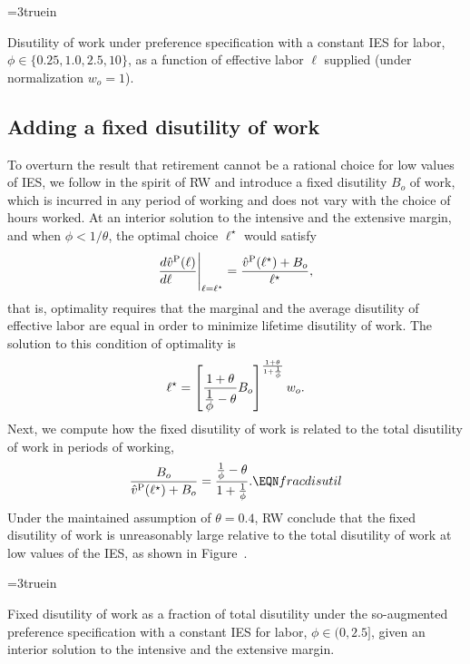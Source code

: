 
\centerline{\epsfxsize=3truein}
\caption{Disutility of work under preference specification 
with a constant IES for labor, 
$\phi\in\{0.25, 1.0, 2.5, 10\}$, 
as a function of effective labor $\ell$ supplied
(under normalization $w_o =1$).}
\endfigure

\subsection{Adding a fixed disutility of work}

To overturn the result that retirement cannot be a rational choice
for low values of IES, we follow in the spirit of RW and introduce a 
fixed disutility $B_o$ of work, which is incurred in any period of 
working and does not vary with the choice of hours worked. At an 
interior solution to the intensive and the extensive margin, and 
when $\phi < 1/\theta$, the optimal choice $\ell^\star$ would 
satisfy
$$
{d \hat v^{\rm P}(\ell) \over d \ell\hfill}\Bigg|_{\ell=\ell^\star} = 
{\hat v^{\rm P}(\ell^\star) + B_o \over \ell^\star},
$$
that is, optimality requires that the marginal and the average 
disutility of effective labor are equal in order to minimize 
lifetime disutility of work. The solution to this condition of
optimality is 
$$
\ell^\star = \left[ {1+\theta \over {\displaystyle 1 
                                  \over \displaystyle \phi}-\theta} B_o 
             \right]^{{1+\theta \over 1+ {1 \over \phi}}} w_o.
$$
Next, we compute how the fixed disutility of work is related to 
the total disutility of work in periods of working,
$$
{B_o \over \hat v^{\rm P}(\ell^\star) +  B_o} 
        = { {1 \over \phi} - \theta  \over
            1+ {1 \over \phi} }.
                                            \EQN fracdisutil
$$
Under the maintained assumption of $\theta=0.4$, RW conclude that 
the fixed disutility of work is unreasonably large relative to 
the total disutility of work at low values of the IES, as 
shown in Figure~. 


\centerline{\epsfxsize=3truein}
\caption{Fixed disutility of work as a fraction of 
total disutility under the so-augmented preference 
specification with a constant IES 
for labor, $\phi\in(0, 2.5]$, given an interior solution
to the intensive and the extensive margin.}
\endfigure


